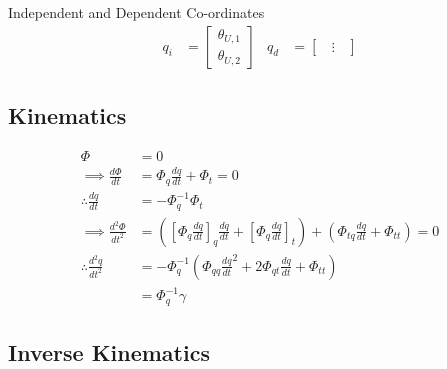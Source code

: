 Independent and Dependent Co-ordinates
\begin{align}
    q_i&=
    \begin{bmatrix}
    \theta_{U,1} \\
    \theta_{U,2}
    \end{bmatrix} &
    q_d&=
    \begin{bmatrix}
    \; \; \vdots \; \;
    \end{bmatrix}
\end{align}

\subsection{Kinematics}
\begin{align}
            \Phi &= 0  \nonumber \\
\implies \tfrac{d\Phi}{dt} &=\Phi_q \tfrac{dq}{dt}+ \Phi_t =0 \label{eq:PhiDot} \\
\therefore \tfrac{dq}{dt}&=-\Phi_q^{-1} \Phi_t \\
\implies \tfrac{d^2\Phi}{dt^2} &=([\Phi_{q}\tfrac{dq}{dt}]_q\tfrac{dq}{dt}+[\Phi_{q}\tfrac{dq}{dt}]_t)+(\Phi_{tq}\tfrac{dq}{dt}+\Phi_{tt})=0 \label{eq:PhiDDot} \\
\therefore  \tfrac{d^2q}{dt^2}&=-\Phi_q^{-1} (\Phi_{qq}\tfrac{dq}{dt}^2+2\Phi_{qt}\tfrac{dq}{dt}+\Phi_{tt}) \nonumber \\
                    &=\Phi_q^{-1} \gamma \label{eq:Gamma}
\end{align}


\subsection{Inverse Kinematics}

